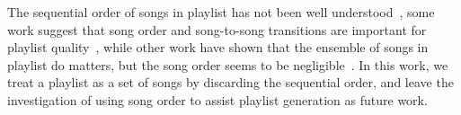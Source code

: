 The sequential order of songs in playlist has not been well understood~\cite{schedl2017},
some work suggest that song order and song-to-song transitions are important 
for playlist quality~\cite{mcfee2012hypergraph,kamehkhosh2018automated},
while other work have shown that the ensemble of songs in playlist do matters, 
but the song order seems to be negligible~\cite{tintarev2017sequences,vall2017importance}.
In this work, we treat a playlist as a set of songs by discarding the sequential order,
and leave the investigation of using song order to assist playlist generation as future work.
